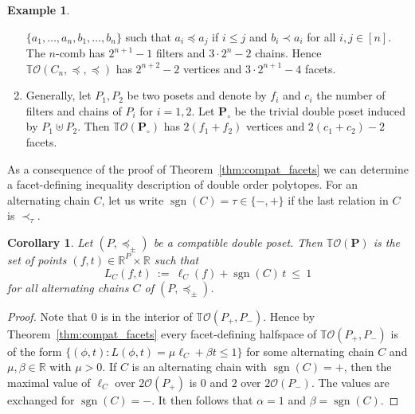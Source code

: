 \documentclass[11pt]{amsart}
\newtheorem{cor}[thm]{Corollary}
\theoremstyle{definition}
\newtheorem{example}{Example}
\begin{document}
\begin{example}
\begin{enumerate}
            $\{a_1,\dots,a_n,b_1,\dots,b_n\}$ such that $a_i \preceq a_j$ if
            $i \le j$ and $b_i \prec a_i$ for all $i,j \in [n]$. The $n$-comb
            has $2^{n+1}-1$ filters and $3\cdot2^{n} - 2$ chains. Hence
            ${{\mathbb{T}}{\mathcal{O}({{C_n,\preceq,\preceq}})}}$ has $2^{n+2}-2$ vertices and
            $3\cdot2^{n+1} - 4$ facets.
        \item Generally, let ${P}_1, {P}_2$ be two posets and denote by $f_i$
            and $c_i$ the number of filters and chains of ${P}_i$ for $i=1,2$.
            Let ${\mathbf{P}}_\circ$ be the trivial double poset induced by ${P}_1 \uplus
            {P}_2$. Then ${{\mathbb{T}}{\mathcal{O}({{{\mathbf{P}}_\circ}})}}$ has $2(f_1+f_2)$ vertices and
            $2(c_1+c_2) - 2$ facets.
    \end{enumerate}
\end{example}

As a consequence of the proof of Theorem~\ref{thm:compat_facets} we can
determine a facet-defining inequality description of double order polytopes.
For an alternating chain $C$, let us write $\operatorname{sgn}(C) = \tau \in \{-,+\}$ if the
last relation in $C$ is $\prec_\tau$.

\begin{cor}\label{cor:TO_ineq}
    Let $({P},\preceq_\pm)$ be a compatible double poset. Then ${{\mathbb{T}}{\mathcal{O}({\mathbf{P}})}}$
    is the set of points $(f,t) \in {\mathbb{R}}^{P} \times {\mathbb{R}}$ such that 
    \[
       L_C(f,t) \ := \ \ell_C(f) + \operatorname{sgn}(C)\, t \ \le \  1 
    \]
    for all alternating chains $C$ of $({P},\preceq_\pm)$.
\end{cor}
\begin{proof}
    Note that $0$ is in the interior of ${{\mathbb{T}}{\mathcal{O}({{{P}_+,{P}_-}})}}$. Hence by
    Theorem~\ref{thm:compat_facets} every facet-defining halfspace of
    ${{\mathbb{T}}{\mathcal{O}({{{P}_+,{P}_-}})}}$ is of the form $\{ (\phi,t) : L(\phi,t) = \mu \ell_C +
    \beta t \le 1\}$ for some alternating chain $C$ and $\mu, \beta \in {\mathbb{R}}$
    with $\mu > 0$. If $C$ is an alternating chain with $\operatorname{sgn}(C) = +$, then
    the maximal value of $\ell_C$ over $2{\mathcal{O}({{P}_+})}$ is $0$ and $2$ over
    $2{\mathcal{O}({{P}_-})}$. The values are exchanged for $\operatorname{sgn}(C) = -$. It then follows
    that $\alpha = 1$ and $\beta = \operatorname{sgn}(C)$.
\end{proof}
\end{document}
